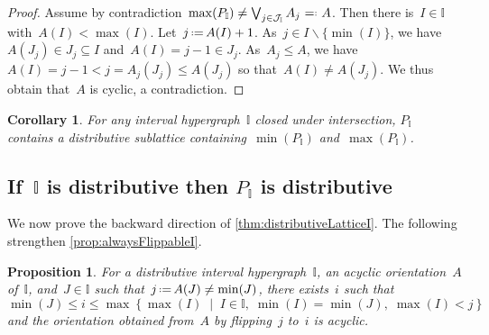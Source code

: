 \documentclass{amsart}
\newtheorem{corollary}[theorem]{Corollary}
\newtheorem{proposition}[theorem]{Proposition}
\theoremstyle{definition}
\newcommand{\cal}[1]{\mathcal{#1}} %
\newcommand{\set}[2]{\left\{ #1 \;\middle|\; #2 \right\}} %
\newcommand{\ssm}{\smallsetminus} %
\newcommand{\eqdef}{\mbox{\,\raisebox{0.2ex}{\scriptsize\ensuremath{\mathrm:}}\ensuremath{=}\,}} %
\newcommand{\defeq}{\mbox{~\ensuremath{=}\raisebox{0.2ex}{\scriptsize\ensuremath{\mathrm:}} }} %
\newcommand{\bigJoin}{\bigvee} %
\newcommand{\II}{\mathbb I} %
\newcommand{\cJ}{\cal{J}} %
\begin{document}
\begin{proof}
Assume by contradiction~$\max(P_\II) \ne \bigJoin_{j \in \cJ_\II} A_j \defeq A$.
Then there is~$I \in \II$ with~${A(I) < \max(I)}$.
Let~$j \eqdef A(I) + 1$.
As~$j \in I \ssm \{\min(I)\}$, we have~$A(J_j) \in J_j \subseteq I$ and~$A(I) = j-1 \in J_j$.
As~$A_j \le A$, we have~$A(I) = j-1 < j = A_j(J_j) \le A(J_j)$ so that~$A(I) \ne A(J_j)$.
We thus obtain that~$A$ is cyclic, a contradiction.
\end{proof}

\begin{corollary}
For any interval hypergraph~$\II$ closed under intersection, $P_\II$ contains a distributive sublattice containing~$\min(P_\II)$ and~$\max(P_\II)$.
\end{corollary}


\subsection{If~$\II$ is distributive then $P_\II$ is distributive}
\label{subsec:distributiveLatticeBackward}

We now prove the backward direction of \cref{thm:distributiveLatticeI}.
The following strengthen \cref{prop:alwaysFlippableI}.

\begin{proposition}
\label{prop:alwaysFlippableDistributive}
For a distributive interval hypergraph~$\II$, an acyclic orientation~$A$ of~$\II$, and~${J \in \II}$ such that~$j \eqdef A(J) \ne \min(J)$, there exists~$i$ such that
\[
\min(J) \le i \le \max\set{\max(I)}{I \in \II, \; \min(I) = \min(J), \; \max(I) < j}
\]
and the orientation obtained from~$A$ by flipping~$j$ to~$i$ is acyclic.
\end{proposition}
\end{document}

